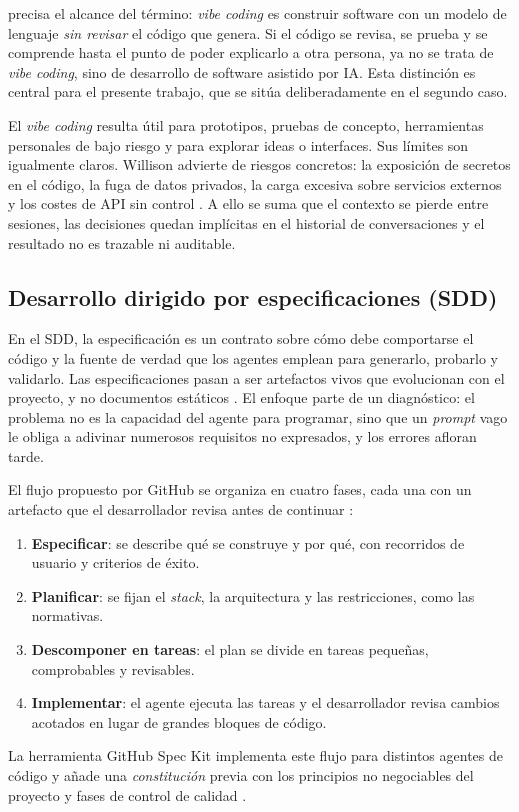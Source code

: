 \citet{willison2025vibe} precisa el alcance del término: \emph{vibe coding} es construir software con un modelo de lenguaje \emph{sin revisar} el código que genera. Si el código se revisa, se prueba y se comprende hasta el punto de poder explicarlo a otra persona, ya no se trata de \emph{vibe coding}, sino de desarrollo de software asistido por IA. Esta distinción es central para el presente trabajo, que se sitúa deliberadamente en el segundo caso.

El \emph{vibe coding} resulta útil para prototipos, pruebas de concepto, herramientas personales de bajo riesgo y para explorar ideas o interfaces. Sus límites son igualmente claros. Willison advierte de riesgos concretos: la exposición de secretos en el código, la fuga de datos privados, la carga excesiva sobre servicios externos y los costes de API sin control \citep{willison2025vibe}. A ello se suma que el contexto se pierde entre sesiones, las decisiones quedan implícitas en el historial de conversaciones y el resultado no es trazable ni auditable.

\subsection{Desarrollo dirigido por especificaciones (SDD)}\label{subsec:SDD}

En el SDD, la especificación es un contrato sobre cómo debe comportarse el código y la fuente de verdad que los agentes emplean para generarlo, probarlo y validarlo. Las especificaciones pasan a ser artefactos vivos que evolucionan con el proyecto, y no documentos estáticos \citep{delimarsky2025sdd}. El enfoque parte de un diagnóstico: el problema no es la capacidad del agente para programar, sino que un \emph{prompt} vago le obliga a adivinar numerosos requisitos no expresados, y los errores afloran tarde.

El flujo propuesto por GitHub se organiza en cuatro fases, cada una con un artefacto que el desarrollador revisa antes de continuar \citep{delimarsky2025sdd}:
\begin{enumerate}
	\item \textbf{Especificar}: se describe qué se construye y por qué, con recorridos de usuario y criterios de éxito.
	\item \textbf{Planificar}: se fijan el \emph{stack}, la arquitectura y las restricciones, como las normativas.
	\item \textbf{Descomponer en tareas}: el plan se divide en tareas pequeñas, comprobables y revisables.
	\item \textbf{Implementar}: el agente ejecuta las tareas y el desarrollador revisa cambios acotados en lugar de grandes bloques de código.
\end{enumerate}
La herramienta GitHub Spec Kit implementa este flujo para distintos agentes de código y añade una \emph{constitución} previa con los principios no negociables del proyecto y fases de control de calidad \citep{github2026speckit,github2026speckitquickstart}.

